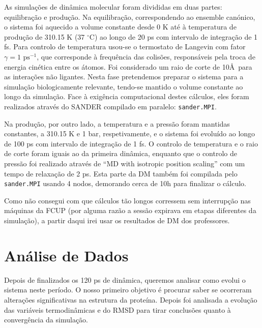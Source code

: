 \documentclass[12pt,a4paper]{article}
\begin{document}
	As simulações de dinâmica molecular foram divididas em duas partes: equilibração e produção. Na equilibração, correspondendo ao ensemble canónico, o sistema foi aquecido a volume constante desde 0 K até à temperatura de produção de 310.15 K (37 $^\circ$C) ao longo de 20 ps com intervalo de integração de 1 fs. Para controlo de temperatura usou-se o termostato de Langevin com fator $\gamma = 1 \textrm{ ps}^{-1}$, que corresponde à frequência das colisões, responsáveis pela troca de energia cinética entre os átomos. Foi considerado um raio de corte de 10\AA \ para as interações não ligantes. Nesta fase pretendemos preparar o sistema para a simulação biologicamente relevante, tendo-se mantido o volume constante ao longo da simulação. Face à exigência computacional destes cálculos, eles foram realizados através do SANDER compilado em paralelo: \verb|sander.MPI|.
	
	Na produção, por outro lado, a temperatura e a pressão foram mantidas constantes, a 310.15 K e 1 bar, respetivamente, e o sistema foi evoluído ao longo de 100 ps com intervalo de integração de 1 fs. O controlo de temperatura e o raio de corte foram iguais ao da primeira dinâmica, enquanto que o controlo de pressão foi realizado através de ``MD with isotropic position scaling'' com um tempo de relaxação de 2 ps. Esta parte da DM também foi compilada pelo \verb|sander.MPI| usando 4 nodos, demorando cerca de 10h para finalizar o cálculo.
	
	Como não consegui com que cálculos tão longos corressem sem interrupção nas máquinas da FCUP (por alguma razão a sessão expirava em etapas diferentes da simulação), a partir daqui irei usar os resultados de DM dos professores.
	
\section{Análise de Dados}
	Depois de finalizados os 120 ps de dinâmica, queremos analisar como evolui o sistema neste período. O nosso primeiro objetivo é procurar saber se ocorreram alterações significativas na estrutura da proteína. Depois foi analisada a evolução das variáveis termodinâmicas e do RMSD para tirar conclusões quanto à convergência da simulação.
	
\end{document}
